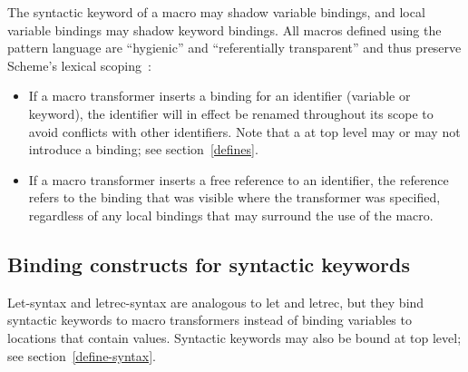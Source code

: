 The syntactic keyword of a macro may shadow variable bindings, and local
variable bindings may shadow keyword bindings.    All macros
defined using the pattern language  are ``hygienic'' and ``referentially
transparent'' and thus preserve Scheme's lexical scoping~\cite{Kohlbecker86,
hygienic,Bawden88,macrosthatwork,syntacticabstraction}:


\begin{itemize}

\item If a macro transformer inserts a binding for an identifier
(variable or keyword), the identifier will in effect be renamed
throughout its scope to avoid conflicts with other identifiers.
Note that a  at top level may or may not introduce a binding;
see section~\ref{defines}.

\item If a macro transformer inserts a free reference to an
identifier, the reference refers to the binding that was visible
where the transformer was specified, regardless of any local
bindings that may surround the use of the macro.

\end{itemize}



\subsection{Binding constructs for syntactic keywords}
\label{bindsyntax}

{\cf Let-syntax} and {\cf letrec-syntax} are
analogous to {\cf let} and {\cf letrec}, but they bind
syntactic keywords to macro transformers instead of binding variables
to locations that contain values.  Syntactic keywords may also be
bound at top level; see section~\ref{define-syntax}.


